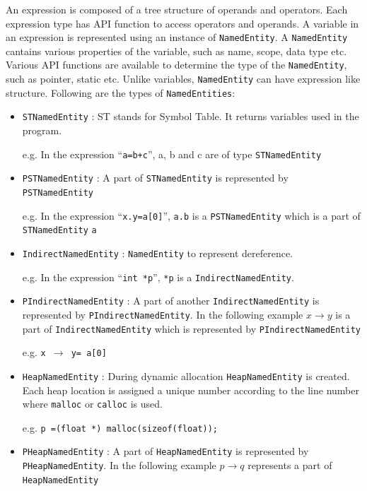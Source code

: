 \documentclass[11pt,a4paper,openright]{report}
\begin{document}
An expression is composed of a tree structure of operands and operators. Each expression type has API function to access operators and operands. 
A variable in an expression is represented using an instance of \texttt{NamedEntity}. A \texttt{NamedEntity} cantains various properties of the variable, such as name, 
scope, data type etc. Various API functions are available to determine the type of the \texttt{NamedEntity}, such as pointer, static etc. Unlike variables, 
\texttt{NamedEntity} can have expression like structure. Following are the types of \texttt{NamedEntities}:
\begin{itemize}
 \item \texttt{STNamedEntity} : ST stands for Symbol Table. It returns variables used in the program.
 
 e.g. In the expression ``\texttt{a=b+c}'', a, b and c are of type \texttt{STNamedEntity}
 
 \item \texttt{PSTNamedEntity} : A part of  \texttt{STNamedEntity} is represented by \texttt{PSTNamedEntity}
 
  e.g. In the expression ``\texttt{x.y=a[0]}'', \texttt{a.b} is a \texttt{PSTNamedEntity} which is a part of \texttt{STNamedEntity} \texttt{a}
 
 \item \texttt{IndirectNamedEntity} : \texttt{NamedEntity} to represent dereference. 
 
 e.g. In the expression ``\texttt{int *p}'', \texttt{*p} is a \texttt{IndirectNamedEntity}. 
 
 \item \texttt{PIndirectNamedEntity} : A part of another \texttt{IndirectNamedEntity} is represented by \texttt{PIndirectNamedEntity}. In the following example $x \rightarrow y$ is a part 
 of \texttt{IndirectNamedEntity} which is represented by \texttt{PIndirectNamedEntity}
 
e.g. \texttt{x $\rightarrow$ y= a[0]}
 
 
 \item \texttt{HeapNamedEntity} : During dynamic allocation \texttt{HeapNamedEntity} is created. Each heap location is assigned a unique number according to the line number where
 \texttt{malloc} or \texttt{calloc}  is used. 
 
e.g. \texttt{p =(float *) malloc(sizeof(float));}
 
 
 \item \texttt{PHeapNamedEntity} : A part of \texttt{HeapNamedEntity} is represented by \texttt{PHeapNamedEntity}. In the following example $p \rightarrow q$ represents a part of \texttt{HeapNamedEntity}
 

\end{itemize}
\end{document}
